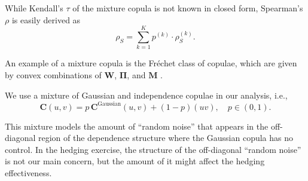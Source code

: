 While Kendall's $\tau$ of the mixture copula is not known in closed form,
Spearman's $\rho$ is easily derived as 
\begin{equation*}
  \rho_S = \sum_{k=1}^K p^{(k)} \cdot \rho_S^{(k)}. 
\end{equation*}




An example of a mixture copula is the Fr\'echet class of copulae, which
are given by convex combinations of $\bm{W}$, $\bm{\Pi}$, and $\bm{M}$
\citep{Nelsen1999}.  

We use a mixture of Gaussian and independence copulae in our analysis,
i.e., 
\begin{equation*}
  \bm{C}(u,v) = p\, \bm{C}^\text{Gaussian}(u,v) + (1-p)(uv),\quad p\in (0,1).
\end{equation*}

This mixture models the amount of ``random noise'' that appears in the
off-diagonal region of the dependence structure where the Gaussian copula has no control.
In the hedging exercise, the structure of the off-diagonal ``random noise'' is not our main concern, 
but the amount of it might affect the hedging effectiveness. 

